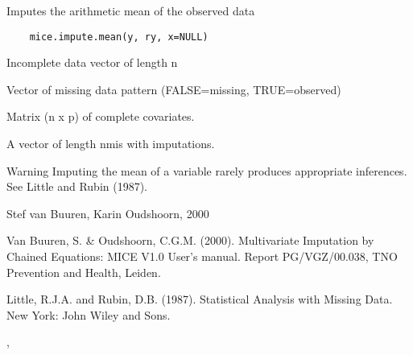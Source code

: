 \documentclass{article}
\begin{document}
\begin{Description}\relax
Imputes the arithmetic mean of the observed data
\end{Description}
\begin{Usage}
\begin{verbatim}
    mice.impute.mean(y, ry, x=NULL)
\end{verbatim}
\end{Usage}
\begin{Arguments}
\begin{ldescription}
\item[\code{y}] Incomplete data vector of length n
\item[\code{ry}] Vector of missing data pattern (FALSE=missing, TRUE=observed)
\item[\code{x}] Matrix (n x p) of complete covariates.

\end{ldescription}


\value{
A vector of length nmis with imputations.}
\end{Arguments}
\begin{Value}
A vector of length nmis with imputations.
\end{Value}
\begin{Section}{Warning}
Imputing the mean of a variable rarely produces appropriate inferences.
See Little and Rubin (1987).
\end{Section}
\begin{Author}\relax
Stef van Buuren, Karin Oudshoorn, 2000
\end{Author}
\begin{References}\relax
Van Buuren, S. \& Oudshoorn, C.G.M. (2000). Multivariate Imputation by Chained Equations: 
MICE V1.0 User's manual. Report PG/VGZ/00.038, TNO Prevention and Health, Leiden.

Little, R.J.A. and Rubin, D.B. (1987). Statistical Analysis with Missing Data. 
New York: John Wiley and Sons.
\end{References}
\begin{SeeAlso}\relax
{}, 
\end{SeeAlso}
\end{document}
